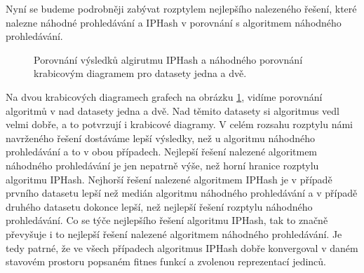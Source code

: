 Nyní se budeme podrobněji zabývat rozptylem nejlepšího nalezeného řešení, které  nalezne náhodné prohledávání a IPHash v porovnání s
algoritmem náhodného prohledávání.

\begin{figure}[!ht]
	\centering
	\caption{Porovnání výsledků algirutmu IPHash a náhodného porovnání krabicovým diagramem pro datasety jedna a dvě.}
	\label{fig:basic_boxplot_1}
\end{figure}

Na dvou krabicových diagramech grafech na obrázku \ref{fig:basic_boxplot_1}, vidíme porovnání
algoritmů v nad datasety jedna a dvě. Nad těmito datasety si algoritmus vedl velmi dobře, a to potvrzují
i krabicové diagramy. V celém rozsahu rozptylu námi navrženého řešení dostáváme lepší výsledky, než u
algoritmu náhodného prohledávání a to v obou případech. Nejlepší řešení nalezené algoritmem náhodného
prohledávání je jen nepatrně výše, než horní hranice rozptylu algoritmu IPHash. Nejhorší řešení nalezené
algoritmem IPHash je v případě prvního datasetu lepší než medián algoritmu náhodného prohledávání a
v případě druhého datasetu dokonce lepší, než nejlepší řešení rozptylu náhodného prohledávání. Co se týče
nejlepšího řešení algoritmu IPHash, tak to značně převyšuje i to nejlepší řešení nalezené algoritmem
náhodného prohledávání. Je tedy patrné, že ve všech případech algoritmus IPHash dobře konvergoval v daném
stavovém prostoru popsaném fitnes funkcí a zvolenou reprezentací jedinců.

